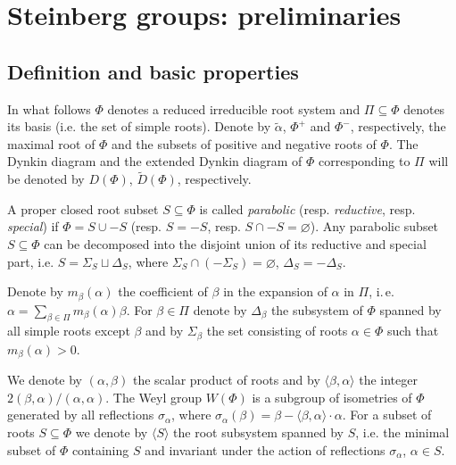 \documentclass[oneside,12pt]{amsart}
\numberwithin{equation}{section}
\numberwithin{lem}{section}
\theoremstyle{definition}
\theoremstyle{remark}
\DeclareMathOperator{\St}{St^G}
\begin{document}
\section{Steinberg groups: preliminaries}


\subsection{Definition and basic properties}

In what follows $\Phi$ denotes a reduced irreducible root system and $\Pi\subseteq \Phi$ denotes its basis (i.e. the set of simple roots).
Denote by $\widetilde{\alpha}$, $\Phi^+$ and $\Phi^-$, respectively, the maximal root of $\Phi$ and the subsets of positive and negative roots of $\Phi$.
The Dynkin diagram and the extended Dynkin diagram of $\Phi$ corresponding to $\Pi$ will be denoted by $D(\Phi)$, $\widetilde{D}(\Phi)$, respectively.

A proper closed root subset $S\subseteq \Phi$ is called {\it parabolic} (resp. {\it reductive}, resp. {\it special}) if $\Phi=S \cup -S$ (resp. $S = -S$, resp. $S \cap -S=\varnothing$).
Any parabolic subset $S \subseteq \Phi$ can be decomposed into the disjoint union of its reductive and special part, i.e. $S = \Sigma_S \sqcup \Delta_S$, where $\Sigma_S \cap (-\Sigma_S) = \varnothing$, $\Delta_S = -\Delta_S$.

Denote by $m_\beta(\alpha)$ the coefficient of $\beta$ in the expansion of $\alpha$ in $\Pi$, i.\,e. $\alpha = \sum_{\beta\in\Pi} m_\beta(\alpha) \beta$.
For $\beta\in\Pi$ denote by $\Delta_\beta$ the subsystem of $\Phi$ spanned by all simple roots except $\beta$ and by $\Sigma_\beta$ the set consisting of roots $\alpha\in \Phi$ such that $m_\beta(\alpha)>0$.

We denote by $(\alpha, \beta)$ the scalar product of roots and by $\langle \beta, \alpha\rangle$ the integer $2(\beta, \alpha)/(\alpha, \alpha)$.
The Weyl group $W(\Phi)$ is a subgroup of isometries of $\Phi$ generated by all reflections $\sigma_\alpha$, where $\sigma_\alpha(\beta)=\beta-\langle\beta,\alpha \rangle\cdot \alpha$.
For a subset of roots $S \subseteq \Phi$ we denote by $\langle S \rangle$ the root subsystem spanned by $S$, i.e. the minimal subset of $\Phi$ containing $S$ and invariant under the action of reflections $\sigma_\alpha$, $\alpha\in S$.
\end{document}
